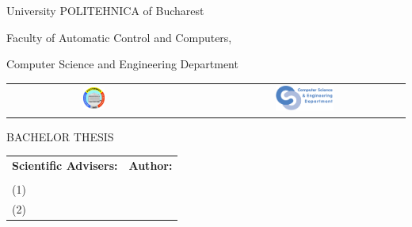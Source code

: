 \begin{titlepage}
	\begin{center}
		{\Large University POLITEHNICA of Bucharest}
		\par\vspace*{2mm}
		{\Large Faculty of Automatic Control and Computers,
		
		Computer Science and Engineering Department}
		\par\vspace*{3mm}
		\begin{table}[h]
        	\begin{center}
				\begin{tabular}{cccc}
                    \includegraphics[width=0.13\textwidth]{src/img/branding/upb}
					& & &
					\includegraphics[width=0.30\textwidth]{src/img/branding/cs}
            	\end{tabular}
			\end{center}
		\end{table}
		
		\par\vspace*{35mm}
		{\Huge BACHELOR THESIS}
		\par\vspace*{15mm}
		{\Huge \VARtitleen}
		\par\vspace*{35mm}
		\begin{table}[h]
        	\begin{center}
				\begin{tabular}{ll}
					\Large \textbf{\Large Scientific Advisers:}
					\vspace*{1mm} & \Large \textbf{\Large Author:}\vspace*{1mm} \\
					\Large \VARadviser \vspace*{0.5mm} & \Large \VARauthor \vspace*{0.5mm} \\
					\Large \otheradvisers(1) \vspace*{0.5mm} & \vspace*{0.5mm} \\
					\Large \otheradvisers(2) \vspace*{0.5mm} & \vspace*{0.5mm}
				\end{tabular}
			\end{center}
		\end{table}

		\par\vspace*{35mm}
		\Large \VARtitlefooteren
	\end{center}
\end{titlepage}
